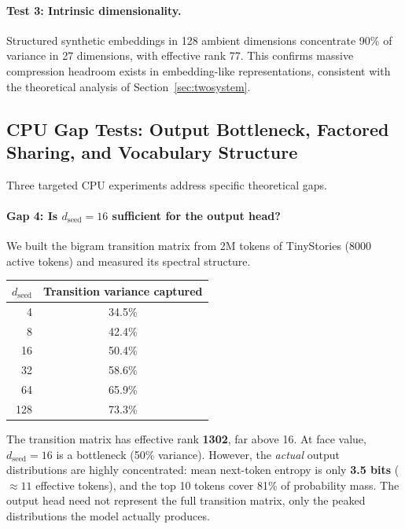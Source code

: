 \documentclass[11pt, a4paper]{article}
\theoremstyle{remark}
\begin{document}
\paragraph{Test 3: Intrinsic dimensionality.}
Structured synthetic embeddings in 128 ambient dimensions concentrate 90\% of variance in 27 dimensions, with effective rank 77.
This confirms massive compression headroom exists in embedding-like representations, consistent with the theoretical analysis of Section~\ref{sec:twosystem}.

\subsection{CPU Gap Tests: Output Bottleneck, Factored Sharing, and Vocabulary Structure}

Three targeted CPU experiments address specific theoretical gaps.

\paragraph{Gap 4: Is $d_{\text{seed}} = 16$ sufficient for the output head?}
We built the bigram transition matrix from 2M tokens of TinyStories (8000 active tokens) and measured its spectral structure.

\begin{center}\small
\renewcommand{\arraystretch}{1.2}
\begin{tabular}{rc}
\toprule
$d_{\text{seed}}$ & Transition variance captured \\
\midrule
4 & 34.5\% \\
8 & 42.4\% \\
16 & 50.4\% \\
32 & 58.6\% \\
64 & 65.9\% \\
128 & 73.3\% \\
\bottomrule
\end{tabular}
\end{center}

\noindent
The transition matrix has effective rank \textbf{1302}, far above 16.
At face value, $d_{\text{seed}} = 16$ is a bottleneck (50\% variance).
However, the \emph{actual} output distributions are highly concentrated:
mean next-token entropy is only \textbf{3.5 bits} ($\approx 11$ effective tokens),
and the top 10 tokens cover 81\% of probability mass.
The output head need not represent the full transition matrix, only the peaked
distributions the model actually produces.
\end{document}

